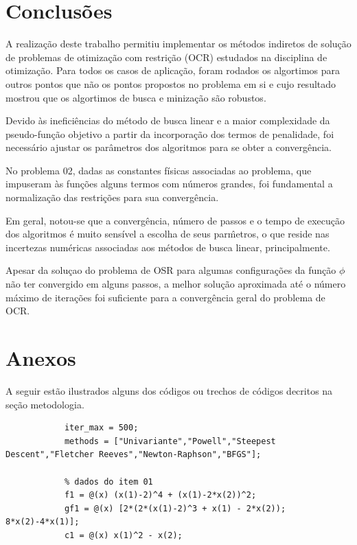 \documentclass[10pt, a4paper]{article}
\begin{document}
\section{Conclus\~oes}

A realiza\c c\~ao deste trabalho permitiu implementar os m\'etodos indiretos de solu\c c\~ao de problemas de otimiza\c c\~ao com restri\c c\~ao (OCR) estudados na disciplina de otimiza\c c\~ao. Para todos os casos de aplica\c c\~ao, foram rodados os algortimos para outros pontos que n\~ao os pontos propostos no problema em si e cujo resultado mostrou que os algortimos de busca e miniza\c c\~ao s\~ao robustos.

Devido \`as inefici\^encias do m\'etodo de busca linear e a maior complexidade da pseudo-fun\c c\~ao objetivo a partir da incorpora\c c\~ao dos termos de penalidade, foi necess\'ario ajustar os par\^ametros dos algoritmos para se obter a converg\^encia.

No problema 02, dadas as constantes f\'isicas associadas ao problema, que impuseram \`as fun\c c\~oes alguns termos com n\'umeros grandes, foi fundamental a normaliza\c c\~ao das restri\c c\~oes para sua converg\^encia.

Em geral, notou-se que a converg\^encia, n\'umero de passos e o tempo de execu\c c\~ao dos algoritmos \'e muito sens\'ivel a escolha de seus par\^metros, o que reside nas incertezas num\'ericas associadas aos m\'etodos de busca linear, principalmente.

Apesar da solu\c cao do problema de OSR para algumas configura\c c\~oes da fun\c c\~ao $\phi$ n\~ao ter convergido em alguns passos, a melhor solu\c c\~ao aproximada at\'e o n\'umero m\'aximo de itera\c c\~oes foi suficiente para a converg\^encia geral do problema de OCR.

\section{Anexos}

A seguir est\~ao ilustrados alguns dos c\'odigos ou trechos de c\'odigos decritos na se\c c\~ao metodologia.

\begin{minipage}{\linewidth}
      \begin{lstlisting}[style=myStyle, caption=Inicializa\c c\~ao e dados do problema 01, label=list_prob01]
            % parametros dos algoritmos
            iter_max = 500;
            methods = ["Univariante","Powell","Steepest Descent","Fletcher Reeves","Newton-Raphson","BFGS"];

            % dados do item 01
            f1 = @(x) (x(1)-2)^4 + (x(1)-2*x(2))^2;
            gf1 = @(x) [2*(2*(x(1)-2)^3 + x(1) - 2*x(2)); 8*x(2)-4*x(1)];
            c1 = @(x) x(1)^2 - x(2);
      \end{lstlisting}
\end{minipage}
\end{document}
